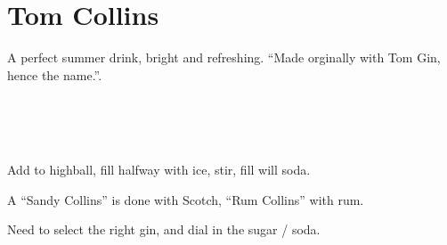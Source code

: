 \section[Tom Collins]{Tom Collins~\vegan}


\begin{recipestats}[
	servings=1,
	preptime=5 \minute,
	source=Mike \& Jane,
	original=\citefield{heresHow1941}{title}\cite{heresHow1941},
]
\end{recipestats}


\begin{recipeabstract}
	A perfect summer drink, bright and refreshing.
	``Made orginally with Tom Gin, hence the name.''\cite{heresHow1941}.
\end{recipeabstract}


\begin{ingredientcolumns}[1]
	\begin{ingredientblock}
		\\
		\\
		\\
	\end{ingredientblock}
\end{ingredientcolumns}


\begin{preparation}
\item Add to highball, fill halfway with ice, stir, fill will soda.
\end{preparation}


\begin{variation}
\item A ``Sandy Collins'' is done with Scotch, ``Rum Collins'' with rum.
\end{variation}

\begin{experiments}
\item Need to select the right gin, and dial in the sugar / soda.
\end{experiments}


\recipeend
